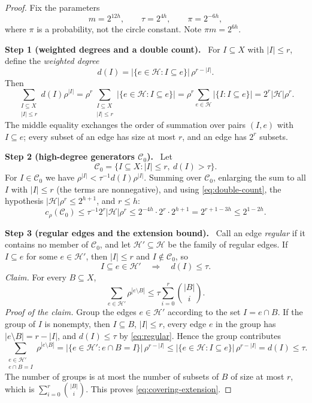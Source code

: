 \documentclass[11pt,letterpaper]{article}
\theoremstyle{definition}
\theoremstyle{remark}
\numberwithin{equation}{section}
\newcommand{\step}[1]{\par\medskip\noindent\textbf{#1}\ }
\begin{document}
\begin{proof}
Fix the parameters
\[
m=2^{12h},\qquad \tau=2^{4h},\qquad \pi=2^{-6h},
\]
where $\pi$ is a probability, not the circle constant. Note
$\pi m=2^{6h}$.

\step{Step 1 (weighted degrees and a double count).}
For \(I\subseteq X\) with \(|I|\le r\), define the \emph{weighted degree}
\[
d(I)=|\{e\in\mathcal H:I\subseteq e\}|\,\rho^{r-|I|}.
\]
Then
\begin{equation}\label{eq:double-count}
\sum_{\substack{I\subseteq X\\|I|\le r}}d(I)\rho^{|I|}
=\rho^r\sum_{\substack{I\subseteq X\\|I|\le r}}
   |\{e\in\mathcal H:I\subseteq e\}|
=\rho^r\sum_{e\in\mathcal H}|\{I:I\subseteq e\}|
=2^r|\mathcal H|\rho^r .
\end{equation}
The middle equality exchanges the order of summation over pairs $(I,e)$
with $I\subseteq e$; every subset of an edge has size at most $r$, and an
edge has $2^r$ subsets.

\step{Step 2 (high-degree generators $\mathcal C_0$).}
Let
\[
\mathcal C_0=\{I\subseteq X:|I|\le r,\ d(I)>\tau\}.
\]
For $I\in\mathcal C_0$ we have $\rho^{|I|}<\tau^{-1}d(I)\rho^{|I|}$.
Summing over $\mathcal C_0$, enlarging the sum to all $I$ with $|I|\le r$
(the terms are nonnegative), and using \eqref{eq:double-count}, the
hypothesis $|\mathcal H|\rho^r\le2^{h+1}$, and $r\le h$:
\begin{equation}\label{eq:covering-initial-cost}
c_\rho(\mathcal C_0)
\le \tau^{-1}2^r|\mathcal H|\rho^r
\le 2^{-4h}\cdot2^{r}\cdot2^{h+1}
=2^{r+1-3h}\le2^{1-2h}.
\end{equation}

\step{Step 3 (regular edges and the extension bound).}
Call an edge \emph{regular} if it contains no member of \(\mathcal C_0\),
and let \(\mathcal H'\subseteq\mathcal H\) be the family of regular edges.
If $I\subseteq e$ for some $e\in\mathcal H'$, then $|I|\le r$ and
$I\notin\mathcal C_0$, so
\begin{equation}\label{eq:regular}
I\subseteq e\in\mathcal H'
\quad\Longrightarrow\quad d(I)\le \tau.
\end{equation}
\emph{Claim.} For every \(B\subseteq X\),
\begin{equation}\label{eq:covering-extension}
\sum_{e\in\mathcal H'}\rho^{|e\setminus B|}
\le \tau\sum_{i=0}^r\binom{|B|}{i}.
\end{equation}
\emph{Proof of the claim.} Group the edges \(e\in\mathcal H'\) according to
the set \(I=e\cap B\). If the group of $I$ is nonempty, then $I\subseteq B$,
$|I|\le r$, every edge $e$ in the group has $|e\setminus B|=r-|I|$, and
$d(I)\le\tau$ by \eqref{eq:regular}. Hence the group contributes
\[
\sum_{\substack{e\in\mathcal H'\\e\cap B=I}}
  \rho^{|e\setminus B|}
=|\{e\in\mathcal H':e\cap B=I\}|\,\rho^{r-|I|}
\le|\{e\in\mathcal H:I\subseteq e\}|\,\rho^{r-|I|}
= d(I)\le \tau.
\]
The number of groups is at most the number of subsets of $B$ of size at most
$r$, which is $\sum_{i=0}^r\binom{|B|}{i}$. This proves
\eqref{eq:covering-extension}.


\end{proof}
\end{document}
